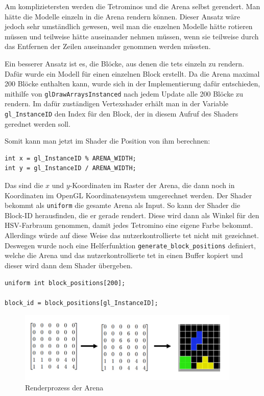 \documentclass[11pt]{article}
\newcommand{\lstin}[1]{\lstinline[language=C]{#1}}
\begin{document}
Am komplizietersten werden die Tetrominos und die Arena selbst gerendert. 
Man hätte die Modelle einzeln in die Arena rendern können. 
Dieser Ansatz wäre jedoch sehr umständlich gewesen, weil man die enzelnen Modelle 
hätte rotieren müssen und teilweise hätte auseinander nehmen müssen, 
wenn sie teilweise durch das Entfernen der Zeilen auseinander genommen werden müssten.

Ein besserer Ansatz ist es, die Blöcke, aus denen die \glspl{tet} einzeln zu rendern.
Dafür wurde ein Modell für einen einzelnen Block erstellt. 
Da die Arena maximal 200 Blöcke enthalten kann, wurde sich in der Implementierung dafür entschieden, 
mithilfe von \lstin{glDrawArraysInstanced} nach jedem Update alle 200 Blöcke zu rendern. 
Im dafür zuständigen Vertexshader erhält man in der Variable \lstin{gl_InstanceID} 
den Index für den Block, der in diesem Aufruf des Shaders gerednet werden soll.

Somit kann man jetzt im Shader die Position von ihm berechnen:
\begin{lstlisting}
int x = gl_InstanceID % ARENA_WIDTH;
int y = gl_InstanceID / ARENA_WIDTH;
\end{lstlisting}
Das sind die $x$ und $y$-Koordinaten im Raster der Arena, die dann noch in Koordinaten im OpenGL Koordinatensystem umgerechnet werden.
Der Shader bekommt als \lstin{uniform} die gesamte Arena als Input.
So kann der Shader die Block-ID herausfinden, die er gerade rendert. Diese wird dann als Winkel für den HSV-Farbraum genommen, 
damit jedes Tetromino eine eigene Farbe bekommt.
Allerdings würde auf diese Weise das nutzerkontrollierte \gls{tet} nicht mit gezeichnet. 
Deswegen wurde noch eine Helferfunktion \lstin{generate_block_positions} definiert, welche die Arena und das nutzerkontrollierte \gls{tet} 
in einen Buffer kopiert und dieser wird dann dem Shader übergeben.

\begin{lstlisting}
uniform int block_positions[200];

block_id = block_positions[gl_InstanceID];
\end{lstlisting}

\begin{figure}
  \centering
  \includegraphics[width=400px]{../images/arena_halb.png}  
  \caption{Renderprozess der Arena}
\end{figure}
\end{document}

